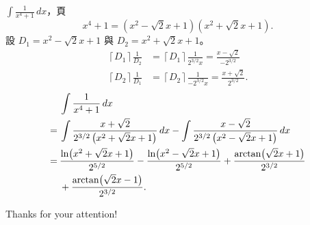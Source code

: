 \documentclass{beamer}
\newcommand{\Left} {\mathopen{}\mathclose\bgroup\left}
\newcommand{\Right}{\aftergroup\egroup\right}
\theoremstyle{remark}
\begin{document}
\begin{CJK}{UTF8}{bsmi}
\begin{frame}[allowframebreaks]{$\displaystyle \int \frac{1}{x^4 + 1}\,dx$，頁}
  \[x^4 + 1 = \left( x^2 - \sqrt2 x + 1 \right) \left( x^2 + \sqrt2 x + 1 \right).\]
  設 $D_1 = x^2 - \sqrt2 x + 1$ 與 $D_2 = x^2 + \sqrt2 x + 1$。
  \begin{align*}
    \left\lceil D_1 \right\rceil \frac{1}{D_2} &= \left\lceil D_1 \right\rceil \frac{1}{2^{3/2} x}
      = \frac{x - \sqrt2}{-2^{3/2}}\\
    \left\lceil D_2 \right\rceil \frac{1}{D_1} &= \left\lceil D_2 \right\rceil \frac{1}{-2^{3/2} x}
      = \frac{x + \sqrt2}{2^{3/2}}.
  \end{align*}
  \begin{align*}
       & \int \frac{1}{x^4 + 1}\,dx\\
    =\:& \int \frac{x + \sqrt2}{2^{3/2} \left( x^2 + \sqrt2 x + 1 \right)}\,dx
	 - \int \frac{x - \sqrt2}{2^{3/2} \left( x^2 - \sqrt2 x + 1 \right)}\,dx\\
    =\:& \frac{\ln \Left( x^2 + \sqrt2 x + 1 \Right)}{2^{5/2}} - \frac{\ln \Left( x^2 - \sqrt2 x + 1 \Right)}{2^{5/2}}
	 + \frac{\arctan \Left( \sqrt2 x + 1 \Right)}{2^{3/2}}\\
    \phantom=\:& +\frac{\arctan \Left( \sqrt2 x - 1 \Right)}{2^{3/2}}.
  \end{align*}
\end{frame}

\begin{frame}
  \begin{center}
    \huge Thanks for your attention!
  \end{center}
\end{frame}
\end{CJK}
\end{document}
